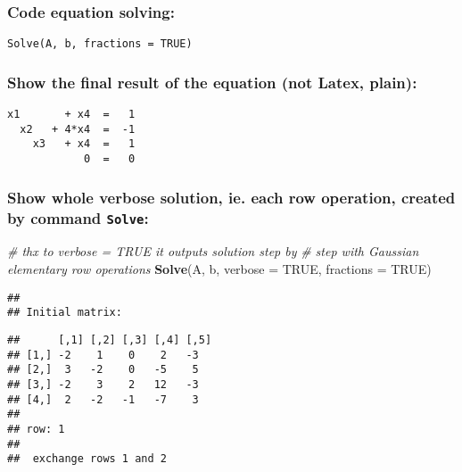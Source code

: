 \documentclass[
  10pt,
  a4paper,
]{article}
\newenvironment{Shaded}{\begin{snugshade}}{\end{snugshade}}
\newcommand{\AttributeTok}[1]{\textcolor[rgb]{0.13,0.29,0.53}{#1}}
\newcommand{\CommentTok}[1]{\textcolor[rgb]{0.56,0.35,0.01}{\textit{#1}}}
\newcommand{\ConstantTok}[1]{\textcolor[rgb]{0.56,0.35,0.01}{#1}}
\newcommand{\FunctionTok}[1]{\textcolor[rgb]{0.13,0.29,0.53}{\textbf{#1}}}
\newcommand{\NormalTok}[1]{#1}
\begin{document}
\hypertarget{code-equation-solving}{%
\subsubsection{Code equation solving:}\label{code-equation-solving}}

\begin{verbatim}
Solve(A, b, fractions = TRUE)
\end{verbatim}

\hypertarget{show-the-final-result-of-the-equation-not-latex-plain}{%
\subsubsection{Show the final result of the equation (not Latex,
plain):}\label{show-the-final-result-of-the-equation-not-latex-plain}}

\begin{verbatim}
x1       + x4  =   1 
  x2   + 4*x4  =  -1 
    x3   + x4  =   1 
            0  =   0 
\end{verbatim}

\hypertarget{show-whole-verbose-solution-ie.-each-row-operation-created-by-command-solve}{%
\subsubsection{\texorpdfstring{Show whole verbose solution, ie. each row
operation, created by command
\texttt{Solve}:}{Show whole verbose solution, ie. each row operation, created by command Solve:}}\label{show-whole-verbose-solution-ie.-each-row-operation-created-by-command-solve}}

\begin{Shaded}
\begin{Highlighting}[]
\CommentTok{\# thx to \textasciigrave{}verbose = TRUE\textasciigrave{} it outputs solution step by}
\CommentTok{\# step with Gaussian elementary row operations}
\FunctionTok{Solve}\NormalTok{(A, b, }\AttributeTok{verbose =} \ConstantTok{TRUE}\NormalTok{, }\AttributeTok{fractions =} \ConstantTok{TRUE}\NormalTok{)}
\end{Highlighting}
\end{Shaded}

\begin{verbatim}
## 
## Initial matrix:
\end{verbatim}

\begin{verbatim}
##      [,1] [,2] [,3] [,4] [,5]
## [1,] -2    1    0    2   -3  
## [2,]  3   -2    0   -5    5  
## [3,] -2    3    2   12   -3  
## [4,]  2   -2   -1   -7    3  
## 
## row: 1 
## 
##  exchange rows 1 and 2
\end{verbatim}
\end{document}
